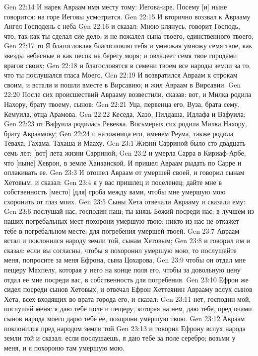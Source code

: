 Gen 22:14  И нарек Авраам имя месту тому: Иегова-ире. Посему [и] ныне говорится: на горе Иеговы усмотрится.
Gen 22:15  И вторично воззвал к Аврааму Ангел Господень с неба
Gen 22:16  и сказал: Мною клянусь, говорит Господь, что, так как ты сделал сие дело, и не пожалел сына твоего, единственного твоего,
Gen 22:17  то Я благословляя благословлю тебя и умножая умножу семя твое, как звезды небесные и как песок на берегу моря; и овладеет семя твое городами врагов своих;
Gen 22:18  и благословятся в семени твоем все народы земли за то, что ты послушался гласа Моего.
Gen 22:19  И возвратился Авраам к отрокам своим, и встали и пошли вместе в Вирсавию; и жил Авраам в Вирсавии.
Gen 22:20  После сих происшествий Аврааму возвестили, сказав: вот, и Милка родила Нахору, брату твоему, сынов:
Gen 22:21  Уца, первенца его, Вуза, брата сему, Кемуила, отца Арамова,
Gen 22:22  Кеседа, Хазо, Пилдаша, Идлафа и Вафуила;
Gen 22:23  от Вафуила родилась Ревекка. Восьмерых сих родила Милка Нахору, брату Авраамову;
Gen 22:24  и наложница его, именем Реума, также родила Теваха, Гахама, Тахаша и Мааху.
Gen 23:1  Жизни Сарриной было сто двадцать семь лет: [вот] лета жизни Сарриной;
Gen 23:2  и умерла Сарра в Кириаф-Арбе, что [ныне] Хеврон, в земле Ханаанской. И пришел Авраам рыдать по Сарре и оплакивать ее.
Gen 23:3  И отошел Авраам от умершей своей, и говорил сынам Хетовым, и сказал:
Gen 23:4  я у вас пришлец и поселенец; дайте мне в собственность [место] [для] гроба между вами, чтобы мне умершую мою схоронить от глаз моих.
Gen 23:5  Сыны Хета отвечали Аврааму и сказали ему:
Gen 23:6  послушай нас, господин наш; ты князь Божий посреди нас; в лучшем из наших погребальных мест похорони умершую твою; никто из нас не откажет тебе в погребальном месте, для погребения умершей твоей.
Gen 23:7  Авраам встал и поклонился народу земли той, сынам Хетовым;
Gen 23:8  и говорил им и сказал: если вы согласны, чтобы я похоронил умершую мою, то послушайте меня, попросите за меня Ефрона, сына Цохарова,
Gen 23:9  чтобы он отдал мне пещеру Махпелу, которая у него на конце поля его, чтобы за довольную цену отдал ее мне посреди вас, в собственность для погребения.
Gen 23:10  Ефрон же сидел посреди сынов Хетовых; и отвечал Ефрон Хеттеянин Аврааму вслух сынов Хета, всех входящих во врата города его, и сказал:
Gen 23:11  нет, господин мой, послушай меня: я даю тебе поле и пещеру, которая на нем, даю тебе, пред очами сынов народа моего дарю тебе ее, похорони умершую твою.
Gen 23:12  Авраам поклонился пред народом земли той
Gen 23:13  и говорил Ефрону вслух народа земли той и сказал: если послушаешь, я даю тебе за поле серебро; возьми у меня, и я похороню там умершую мою.
